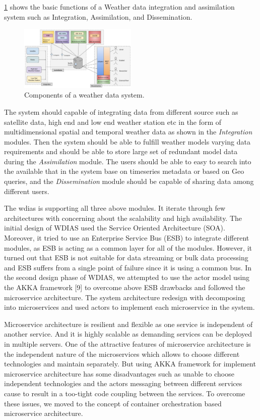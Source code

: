 \documentclass[conference]{IEEEtran}
\begin{document}
\cref{pfi:wdia_components} shows the basic functions of a Weather data integration and assimilation system such as Integration, Assimilation, and Dissemination.

\begin{figure}[htbp]
\centerline{\includegraphics[width=0.5\textwidth]{method/misc/weather_data_system_components.jpg}}
\caption{Components of a weather data system.}
\label{pfi:wdia_components}
\end{figure}

The system should capable of integrating data from different source such as satellite data, high end and low end weather station etc in the form of multidimensional spatial and temporal weather data as shown in the \emph{Integration} modules.
Then the system should be able to fulfill weather models varying data requirements and should be able to store large set of redundant model data during the \emph{Assimilation} module.
The users should be able to easy to search into the available that in the system base on timeseries metadata or based on Geo queries, and the \emph{Dissemination} module should be capable of sharing data among different users.

The \acrshort{wdias} is supporting all three above modules. It iterate through few architectures with concerning about the scalability and high availability.
The initial design of WDIAS used the Service Oriented Architecture (SOA). Moreover, it tried to use an Enterprise Service Bus (ESB) to integrate different modules, as ESB is acting as a common layer for all of the modules. However, it turned out that ESB is not suitable for data streaming or bulk data processing and ESB suffers from a single point of failure since it is using a common bus.
In the second design phase of WDIAS, we attempted to use the actor model using the AKKA framework [9] to overcome above ESB drawbacks and followed the microservice architecture. The system architecture redesign with decomposing into microservices and
used actors to implement each microservice in the system.

Microservice architecture is resilient and flexible as one service is independent of another service. And it is highly scalable as demanding services can be deployed in multiple servers. One of the attractive features of microservice architecture is the independent nature of the microservices which allows to choose different technologies and maintain separately. But using AKKA framework for implement microservice architecture has some disadvantages such as unable to choose independent technologies and the actors messaging between different services cause to result in a too-tight code coupling between the services. To overcome these issues, we moved to the concept of container orchestration based microservice architecture.
\end{document}

